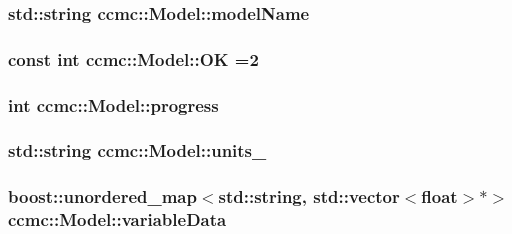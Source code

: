 \hypertarget{classccmc_1_1_model_a6165e9aac67ae0cbe536e350d03161f3}{
\subsubsection[{model\-Name}]{\setlength{\rightskip}{0pt plus 5cm}std\-::string ccmc\-::\-Model\-::model\-Name\hspace{0.3cm}{\ttfamily [protected]}}}\label{classccmc_1_1_model_a6165e9aac67ae0cbe536e350d03161f3}
\hypertarget{classccmc_1_1_model_a0a921cfb116d7b5e8e7b49b42c151f18}{
\subsubsection[{O\-K}]{\setlength{\rightskip}{0pt plus 5cm}const int ccmc\-::\-Model\-::\-O\-K =2\hspace{0.3cm}{\ttfamily [static]}}}\label{classccmc_1_1_model_a0a921cfb116d7b5e8e7b49b42c151f18}
\hypertarget{classccmc_1_1_model_a300d5ede0268098899a9fb248281ead5}{
\subsubsection[{progress}]{\setlength{\rightskip}{0pt plus 5cm}int ccmc\-::\-Model\-::progress\hspace{0.3cm}{\ttfamily [protected]}}}\label{classccmc_1_1_model_a300d5ede0268098899a9fb248281ead5}
\hypertarget{classccmc_1_1_model_ac6ae99aaeac03d14ffde2e82c39b436a}{
\subsubsection[{units\-\_\-}]{\setlength{\rightskip}{0pt plus 5cm}std\-::string ccmc\-::\-Model\-::units\-\_\-\hspace{0.3cm}{\ttfamily [protected]}}}\label{classccmc_1_1_model_ac6ae99aaeac03d14ffde2e82c39b436a}
\hypertarget{classccmc_1_1_model_a69edb30c3bc8ce3c68ec0a883c219d94}{
\subsubsection[{variable\-Data}]{\setlength{\rightskip}{0pt plus 5cm}boost\-::unordered\-\_\-map$<$std\-::string, std\-::vector$<$float$>$$\ast$$>$ ccmc\-::\-Model\-::variable\-Data\hspace{0.3cm}{\ttfamily [protected]}}}\label{classccmc_1_1_model_a69edb30c3bc8ce3c68ec0a883c219d94}
